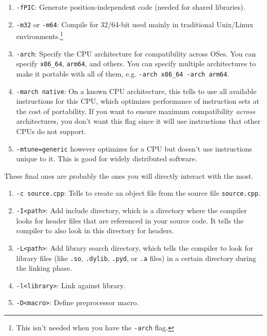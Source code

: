 \documentclass{article}
\begin{document}
      \begin{definition}
        \begin{enumerate}
          \item \texttt{-fPIC}: Generate position-independent code (needed for shared libraries). 
          \item \texttt{-m32} or \texttt{-m64}: Compile for 32/64-bit used mainly in traditional Unix/Linux environments.\footnote{This isn't needed when you have the \texttt{-arch} flag.}
          \item \texttt{-arch}: Specify the CPU architecture for compatibility across OSes. You can specify \texttt{x86\_64}, \texttt{arm64}, and others. You can specify multiple architectures to make it portable with all of them, e.g. \texttt{-arch x86\_64 -arch arm64}. 
          \item \texttt{-march native}: On a known CPU architecture, this tells to use all available instructions for this CPU, which optimizes performance of instruction sets at the cost of portability. If you want to ensure maximum compatibility \textit{across} architectures, you don't want this flag since it will use instructions that other CPUs do not support. 
          \item \texttt{-mtune=generic} however optimizes for a CPU but doesn't use instructions unique to it. This is good for widely distributed software. 
        \end{enumerate}
      \end{definition}

      \begin{definition}
        These final ones are probably the ones you will directly interact with the most. 
        \begin{enumerate}
          \item \texttt{-c source.cpp}: Tells to create an object file from the source file \texttt{source.cpp}. 
          \item \texttt{-I<path>}: Add include directory, which is a directory where the compiler looks for header files that are referenced in your source code. It tells the compiler to also look in this directory for headers. 
          \item \texttt{-L<path>}: Add library search directory, which tells the compiler to look for library files (like \texttt{.so}, \texttt{.dylib}, \texttt{.pyd}, or \texttt{.a} files) in a certain directory during the linking phase. 
          \item \texttt{-l<library>}: Link against library. 
          \item \texttt{-D<macro>}: Define preprocessor macro. 
        \end{enumerate}
      \end{definition}
\end{document}

